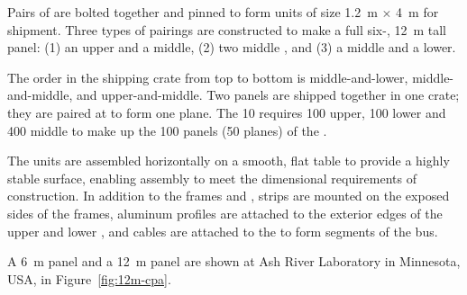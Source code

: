 Pairs of  are bolted together and pinned to form  units of size \SI{1.2}{\m} $\times$ \SI{4}{\m} for shipment. Three types of pairings are constructed to make a full six-, \SI{12}{\m} tall  panel: (1) an upper and a middle, (2) two middle , and (3) a middle and a lower.

The order in the shipping crate from top to bottom is middle-and-lower, middle-and-middle, and upper-and-middle.   Two  panels are shipped together in one crate; they are paired at \surf to form one  plane.  The \SI{10}{\kt}  requires 100 upper, 100 lower and 400 middle  to make up the 100  panels (50  planes) of the .

The  units are assembled horizontally on a smooth, flat table to provide a highly stable surface, enabling assembly to meet the dimensional requirements of  construction.  
In addition to the frames and , 
 strips are mounted on the exposed sides of the \frfour frames, aluminum profiles are attached to the exterior edges of the upper and lower , 
and cables are attached to the  to form segments of the  bus.  

A \SI{6}{\m}   panel and a \SI{12}{\m}   panel are shown at Ash River Laboratory in Minnesota, USA,  in Figure~\ref{fig:12m-cpa}.

